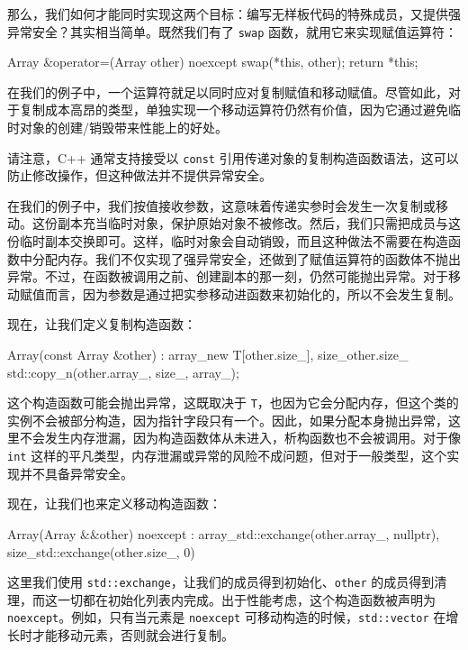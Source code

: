 那么，我们如何才能同时实现这两个目标：编写无样板代码的特殊成员，又提供强异常安全？其实相当简单。既然我们有了 \texttt{swap} 函数，就用它来实现赋值运算符：

\begin{codebox}[cpp]
Array &operator=(Array other) noexcept {
    swap(*this, other);
    return *this;
}
\end{codebox}

在我们的例子中，一个运算符就足以同时应对复制赋值和移动赋值。尽管如此，对于复制成本高昂的类型，单独实现一个移动运算符仍然有价值，因为它通过避免临时对象的创建/销毁带来性能上的好处。

请注意，C++ 通常支持接受以 \texttt{const} 引用传递对象的复制构造函数语法，这可以防止修改操作，但这种做法并不提供异常安全。

\label{idx:535}
\label{idx:536}
在我们的例子中，我们按值接收参数，这意味着传递实参时会发生一次复制或移动。这份副本充当临时对象，保护原始对象不被修改。然后，我们只需把成员与这份临时副本交换即可。这样，临时对象会自动销毁，而且这种做法不需要在构造函数中分配内存。我们不仅实现了强异常安全，还做到了赋值运算符的函数体不抛出异常。不过，在函数被调用之前、创建副本的那一刻，仍然可能抛出异常。对于移动赋值而言，因为参数是通过把实参移动进函数来初始化的，所以不会发生复制。

现在，让我们定义复制构造函数：

\begin{codebox}[cpp]
Array(const Array &other) : array_{new T[other.size_]}, size_{other.size_}
{
    std::copy_n(other.array_, size_, array_);
}
\end{codebox}

这个构造函数可能会抛出异常，这既取决于 \texttt{T}，也因为它会分配内存，但这个类的实例不会被部分构造，因为指针字段只有一个。因此，如果分配本身抛出异常，这里不会发生内存泄漏，因为构造函数体从未进入，析构函数也不会被调用。对于像 \texttt{int} 这样的平凡类型，内存泄漏或异常的风险不成问题，但对于一般类型，这个实现并不具备异常安全。

现在，让我们也来定义移动构造函数：

\begin{codebox}[cpp]
Array(Array &&other) noexcept
    : array_{std::exchange(other.array_, nullptr)}, size_{std::exchange(other.size_, 0)} {}
\end{codebox}

\label{idx:537}
\label{idx:538}
这里我们使用 \texttt{std::\allowbreak{}exchange}，让我们的成员得到初始化、\texttt{other} 的成员得到清理，而这一切都在初始化列表内完成。出于性能考虑，这个构造函数被声明为 \texttt{noexcept}。例如，只有当元素是 \texttt{noexcept} 可移动构造的时候，\texttt{std::\allowbreak{}vector} 在增长时才能移动元素，否则就会进行复制。


